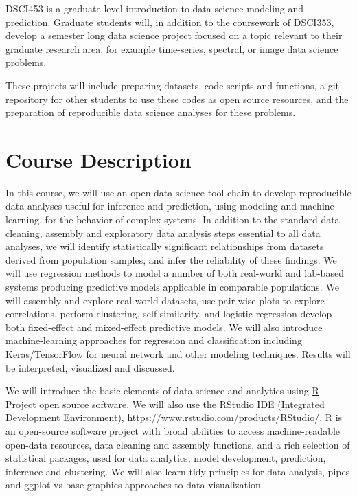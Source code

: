 \documentclass[11pt]{article} %
\begin{document}
    DSCI453 is a graduate level introduction to data science modeling and prediction. 
    Graduate students will, in addition to the coursework of DSCI353, develop a semester long data science project focused on a topic relevant to their graduate research area, for example time-series, spectral, or image data science problems. 
    
    These projects will include preparing datasets, code scripts and functions, a git repository for other students to use these codes as open source resources, and the preparation of reproducible data science analyses for these problems. 

\section{Course Description}

  In this course, we will use an open data science tool chain to develop reproducible data analyses useful for inference and prediction, using modeling and machine learning, for the behavior of complex systems. 
  In addition to the standard data cleaning, assembly and exploratory data analysis steps essential to all data analyses, we will identify statistically significant relationships from datasets derived from population samples, and infer the reliability of these findings. 
  We will use regression methods to model a number of both real-world and lab-based systems producing predictive models applicable in comparable populations. 
  We will assembly and explore real-world datasets, use pair-wise plots to explore correlations, perform clustering, self-similarity, and logistic regression develop both fixed-effect and mixed-effect predictive models. 
  We will also introduce machine-learning approaches for regression and classification including Keras/TensorFlow for neural network and other modeling techniques. 
  Results will be interpreted, visualized and discussed. 
  
  We will introduce the basic elements of data science and analytics using \href{"http://cran.case.edu/"}{R Project open source software}. 
  We will also use the RStudio IDE (Integrated Development Environment), \href{"https://www.rstudio.com/products/RStudio/''}{https://www.rstudio.com/products/RStudio/}. 
  R is an open-source software project with broad abilities to access machine-readable open-data resources, data cleaning and assembly functions, and a rich selection of statistical packages, used for data analytics, model development, prediction, inference and clustering. 
  We will also learn tidy principles for data analysis, pipes and ggplot vs base graphics approaches to data visualization. 
  
\end{document}
